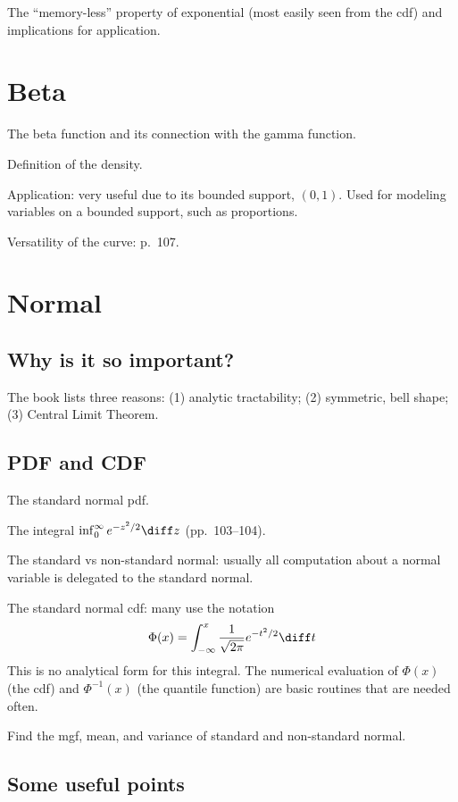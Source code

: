 \documentclass[12pt]{article}
\begin{document}
The ``memory-less'' property of exponential
(most easily seen from the cdf)
and implications for
application.

\section{Beta}

The beta function and its connection with the gamma function.

Definition of the density.

Application: very useful due to its bounded support, $(0, 1)$.
Used for modeling variables on a bounded support, such as proportions.

Versatility of the curve: p.~107.

\section{Normal}

\subsection{Why is it so important?}

The book lists three reasons:
(1) analytic tractability;
(2) symmetric, bell shape;
(3) Central Limit Theorem.

\subsection{PDF and CDF}

The standard normal pdf.

The integral $\inf_0^\infty e^{-z^2/2} \diff z$ (pp.~103--104).

The standard vs non-standard normal: usually all computation about a
normal variable is delegated to the standard normal.

The standard normal cdf: many use the notation
\[
\Phi(x) = \int_{-\infty}^x \frac{1}{\sqrt{2\pi}} e^{-t^2/2} \diff t
\]
This is no analytical form for this integral.
The numerical evaluation of $\Phi(x)$ (the cdf)
and $\Phi^{-1}(x)$ (the quantile function) are basic routines
that are needed often.

\exercise
Find the mgf, mean, and variance of standard and non-standard normal.

\subsection{Some useful points}
\end{document}

